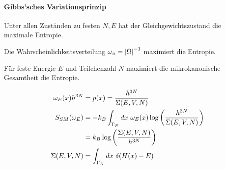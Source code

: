 \paragraph{Gibbs'sches Variationsprinzip}
Unter allen Zuständen zu festen $N,E$ hat der Gleichgewichtszustand die
maximale Entropie.

\begin{lemma}
    Die Wahrscheinlichkeitsverteilung $\omega_u = \left\vert \Omega \right\vert^{-1}$ maximiert
    die Entropie.

\end{lemma}

\begin{theorem}
    Für feste Energie $E$ und Teilchenzahl $N$ maximiert die mikrokanonische
    Gesamtheit die Entropie.
\end{theorem}

\begin{bemerkung}
    \begin{align*}
        \omega_E (x) h^{3N} &= p(x) = \frac{h^{3N}}{\Sigma(E,V,N)}
        \\
        S_{SM}(\omega_E) &= - k_B \int_{\Gamma_N} dx \ \omega_E (x) \log \left( \frac{h^{3N}}{\Sigma (E,V,N)} \right)
        \\
        &= k_B \log \left( \frac{\Sigma(E,V,N)}{h^{3N}} \right)
        \\
        \Sigma(E,V,N) &= \int_{\Gamma_N} dx \ \delta(H(x) - E)
    \end{align*}
\end{bemerkung}


